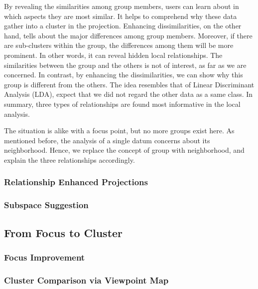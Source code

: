 By revealing the similarities among group members, users can learn about in which aspects they are most similar. It helps to comprehend why these data gather into a cluster in the projection. Enhancing dissimilarities, on the other hand, tells about the major differences among group members. Moreover, if there are sub-clusters within the group, the differences among them will be more prominent. In other words, it can reveal hidden local relationships. The similarities between the group and the others is not of interest, as far as we are concerned. In contrast, by enhancing the dissimilarities, we can show why this group is different from the others. The idea resembles that of Linear Discriminant Analysis (LDA), expect that we did not regard the other data as a same class. In summary, three types of relationships are found most informative in the local analysis.

The situation is alike with a focus point, but no more groups exist here. As mentioned before, the analysis of a single datum concerns about its neighborhood. Hence, we replace the concept of group with neighborhood, and explain the three relationships accordingly.

\subsubsection{Relationship Enhanced Projections}
\subsubsection{Subspace Suggestion}
\subsection{From Focus to Cluster}
\subsubsection{Focus Improvement}
\subsubsection{Cluster Comparison via Viewpoint Map}
